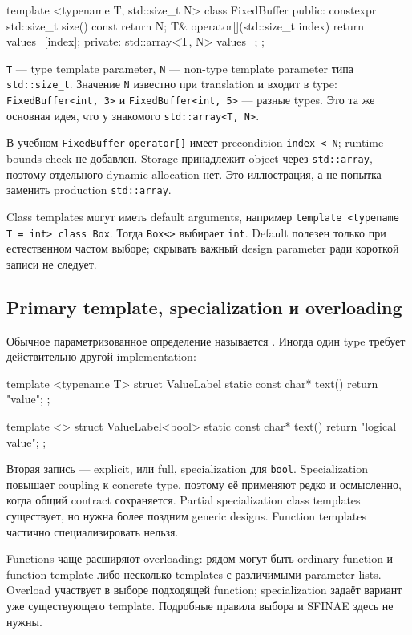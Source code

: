 \begin{cppcode}
template <typename T, std::size_t N>
class FixedBuffer {
public:
    constexpr std::size_t size() const { return N; }
    T& operator[](std::size_t index) { return values_[index]; }
private:
    std::array<T, N> values_{};
};
\end{cppcode}

\texttt{T} --- type template parameter, \texttt{N} --- non-type template
parameter типа \texttt{std::size\_t}. Значение \texttt{N} известно при
translation и входит в type: \texttt{FixedBuffer<int, 3>} и
\texttt{FixedBuffer<int, 5>} --- разные types. Это та же основная идея, что у
знакомого \texttt{std::array<T, N>}.

В учебном \texttt{FixedBuffer} \texttt{operator[]} имеет precondition
\texttt{index < N}; runtime bounds check не добавлен. Storage принадлежит
object через \texttt{std::array}, поэтому отдельного dynamic allocation нет.
Это иллюстрация, а не попытка заменить production \texttt{std::array}.

Class templates могут иметь default arguments, например
\texttt{template <typename T = int> class Box}. Тогда \texttt{Box<>} выбирает
\texttt{int}. Default полезен только при естественном частом выборе; скрывать
важный design parameter ради короткой записи не следует.

\subsection{Primary template, specialization и overloading}

Обычное параметризованное определение называется .
Иногда один type требует действительно другой implementation:

\begin{cppcode}
template <typename T>
struct ValueLabel {
    static const char* text() { return "value"; }
};

template <>
struct ValueLabel<bool> {
    static const char* text() { return "logical value"; }
};
\end{cppcode}

Вторая запись --- explicit, или full, specialization для \texttt{bool}.
Specialization повышает coupling к concrete type, поэтому её применяют редко
и осмысленно, когда общий contract сохраняется. Partial specialization class
templates существует, но нужна более поздним generic designs. Function
templates частично специализировать нельзя.

Functions чаще расширяют overloading: рядом могут быть ordinary function и
function template либо несколько templates с различимыми parameter lists.
Overload участвует в выборе подходящей function; specialization задаёт вариант
уже существующего template. Подробные правила выбора и SFINAE здесь не нужны.


